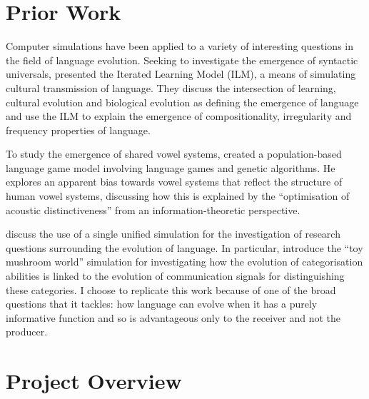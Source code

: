 \documentclass[12pt,a4paper]{report}
\begin{document}
\section{Prior Work}

Computer simulations have been applied to a variety of interesting questions in the field of language evolution. Seeking to investigate the emergence of syntactic universals, \citet{kirby2002emergence} presented the Iterated Learning Model (ILM), a means of simulating cultural transmission of language. They discuss the intersection of learning, cultural evolution and biological evolution as defining the emergence of language and use the ILM to explain the emergence of compositionality, irregularity and frequency properties of language.

To study the emergence of shared vowel systems, \citet{de1997generating} created a population-based language game model involving language games and genetic algorithms. He explores an apparent bias towards vowel systems that reflect the structure of human vowel systems, discussing how this is explained by the ``optimisation of acoustic distinctiveness'' from an information-theoretic perspective.

\citet{parisi2002unified} discuss the use of a single unified simulation for the investigation of research questions surrounding the evolution of language. In particular, \citet{Cangelosi1998} introduce the ``toy mushroom world'' simulation for investigating how the evolution of categorisation abilities is linked to the evolution of communication signals for distinguishing these categories. I choose to replicate this work because of one of the broad questions that it tackles: how language can evolve when it has a purely informative function and so is advantageous only to the receiver and not the producer. 


\section{Project Overview}
\end{document}
